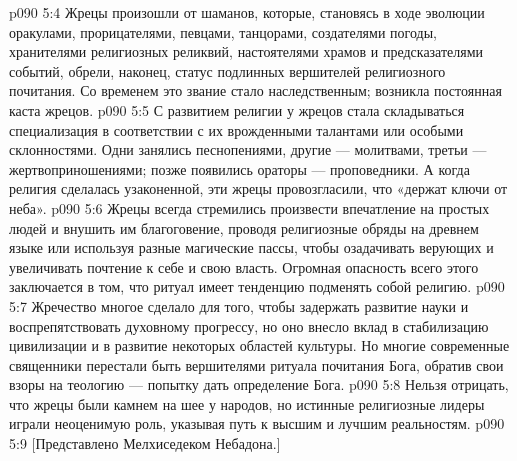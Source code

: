 \vs p090 5:4 \pc Жрецы произошли от шаманов, которые, становясь в ходе эволюции оракулами, прорицателями, певцами, танцорами, создателями погоды, хранителями религиозных реликвий, настоятелями храмов и предсказателями событий, обрели, наконец, статус подлинных вершителей религиозного почитания. Со временем это звание стало наследственным; возникла постоянная каста жрецов.
\vs p090 5:5 С развитием религии у жрецов стала складываться специализация в соответствии с их врожденными талантами или особыми склонностями. Одни занялись песнопениями, другие --- молитвами, третьи --- жертвоприношениями; позже появились ораторы --- проповедники. А когда религия сделалась узаконенной, эти жрецы провозгласили, что «держат ключи от неба».
\vs p090 5:6 Жрецы всегда стремились произвести впечатление на простых людей и внушить им благоговение, проводя религиозные обряды на древнем языке или используя разные магические пассы, чтобы озадачивать верующих и увеличивать почтение к себе и свою власть. Огромная опасность всего этого заключается в том, что ритуал имеет тенденцию подменять собой религию.
\vs p090 5:7 Жречество многое сделало для того, чтобы задержать развитие науки и воспрепятствовать духовному прогрессу, но оно внесло вклад в стабилизацию цивилизации и в развитие некоторых областей культуры. Но многие современные священники перестали быть вершителями ритуала почитания Бога, обратив свои взоры на теологию --- попытку дать определение Бога.
\vs p090 5:8 Нельзя отрицать, что жрецы были камнем на шее у народов, но истинные религиозные лидеры играли неоценимую роль, указывая путь к высшим и лучшим реальностям.
\vsetoff
\vs p090 5:9 [Представлено Мелхиседеком Небадона.]
